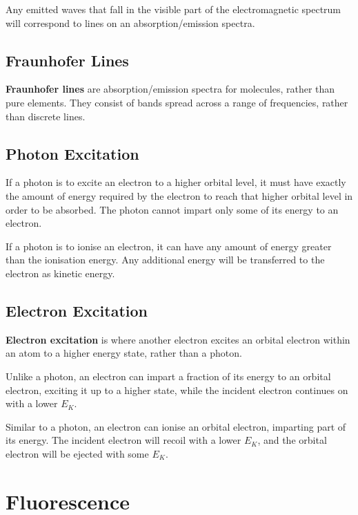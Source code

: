 \documentclass[a4paper,11pt]{report}
\begin{document}
Any emitted waves that fall in the visible part of the electromagnetic spectrum
will correspond to lines on an absorption/emission spectra.

\subsection{Fraunhofer Lines}

\textbf{Fraunhofer lines} are absorption/emission spectra for molecules, rather
than pure elements. They consist of bands spread across a range of frequencies,
rather than discrete lines.

\subsection{Photon Excitation}

If a photon is to excite an electron to a higher orbital level, it must have
exactly the amount of energy required by the electron to reach that higher
orbital level in order to be absorbed. The photon cannot impart only some of
its energy to an electron.

If a photon is to ionise an electron, it can have any amount of energy greater
than the ionisation energy. Any additional energy will be transferred to the
electron as kinetic energy.

\subsection{Electron Excitation}

\textbf{Electron excitation} is where another electron excites an orbital
electron within an atom to a higher energy state, rather than a photon.

Unlike a photon, an electron can impart a fraction of its energy to an orbital
electron, exciting it up to a higher state, while the incident electron
continues on with a lower $E_K$.

Similar to a photon, an electron can ionise an orbital electron, imparting
part of its energy. The incident electron will recoil with a lower $E_K$, and
the orbital electron will be ejected with some $E_K$.


\section{Fluorescence}

\end{document}
